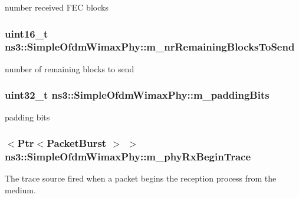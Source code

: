 number received F\+EC blocks 

\subsubsection[{\texorpdfstring{m\+\_\+nr\+Remaining\+Blocks\+To\+Send}{m_nrRemainingBlocksToSend}}]{\setlength{\rightskip}{0pt plus 5cm}uint16\+\_\+t ns3\+::\+Simple\+Ofdm\+Wimax\+Phy\+::m\+\_\+nr\+Remaining\+Blocks\+To\+Send\hspace{0.3cm}{\ttfamily [private]}}\hypertarget{classns3_1_1SimpleOfdmWimaxPhy_ab620d0d5dfe17d488f58af20e0af6113}{}\label{classns3_1_1SimpleOfdmWimaxPhy_ab620d0d5dfe17d488f58af20e0af6113}


number of remaining blocks to send 

\subsubsection[{\texorpdfstring{m\+\_\+padding\+Bits}{m_paddingBits}}]{\setlength{\rightskip}{0pt plus 5cm}uint32\+\_\+t ns3\+::\+Simple\+Ofdm\+Wimax\+Phy\+::m\+\_\+padding\+Bits\hspace{0.3cm}{\ttfamily [private]}}\hypertarget{classns3_1_1SimpleOfdmWimaxPhy_ae06e32aa0737ae886a97e364b0c56de1}{}\label{classns3_1_1SimpleOfdmWimaxPhy_ae06e32aa0737ae886a97e364b0c56de1}


padding bits 

\subsubsection[{\texorpdfstring{m\+\_\+phy\+Rx\+Begin\+Trace}{m_phyRxBeginTrace}}]{$<${\bf Ptr}$<${\bf Packet\+Burst} $>$ $>$ ns3\+::\+Simple\+Ofdm\+Wimax\+Phy\+::m\+\_\+phy\+Rx\+Begin\+Trace\hspace{0.3cm}{\ttfamily [private]}}\hypertarget{classns3_1_1SimpleOfdmWimaxPhy_a1681c13eaa52d28c39f2232b9148417d}{}\label{classns3_1_1SimpleOfdmWimaxPhy_a1681c13eaa52d28c39f2232b9148417d}
The trace source fired when a packet begins the reception process from the medium.

